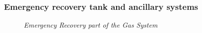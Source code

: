 \subsubsection*{Emergency recovery tank and ancillary systems}

\begin{figure}[hpt!]
    \bigskip
    \begin{center}\leavevmode
        \caption{\textit{Emergency Recovery part of the Gas System}}
        \label{fig.GER}
    \end{center}
\end{figure}

